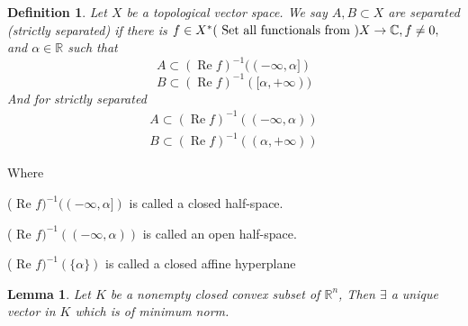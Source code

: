 \documentclass[oneside]{book}
\newtheorem{lemma}[theorem]{Lemma}
\newtheorem{mydef}{Definition}[section]
\begin{document}
	
	
	
	
	
	
	
	
	\begin{mydef} 
		Let $X$ be a topological vector space. We say $A, B \subset X$ are separated (strictly separated) if there is $f \in X^{*}(\text{ Set  all functionals from }) \newline
		X \rightarrow \mathbb{C}, f \neq 0,$ and $\alpha \in \mathbb{R}$ such that
		\[
		A \subset(\operatorname{Re} f)^{-1}((-\infty, \alpha])
		\]
		\[
		B \subset(\operatorname{Re} f)^{-1}([\alpha,+\infty))
		\]
		And for strictly separated
		\[
		\begin{array}{l}
		A \subset(\operatorname{Re} f)^{-1}((-\infty, \alpha)) \\
		B \subset(\operatorname{Re} f)^{-1}((\alpha,+\infty))
		\end{array}
		\]
	\end{mydef}
	
	Where 
	\hfill \ \break
	
	\quad \quad \quad \quad \quad 
	( Re $f)^{-1}((-\infty, \alpha])$ is called a closed half-space.
	\newline
	
	\quad \quad \quad \quad \quad ( Re $f)^{-1}((-\infty, \alpha))$ is called an open half-space.
	\newline
	
	\quad \quad \quad \quad \quad ( Re $f)^{-1}(\{\alpha\})$ is called a closed affine hyperplane
	
	
	
	
	
	
	
	\begin{lemma}
		\label{l:1}
		Let $K$ be a nonempty closed convex subset of $\mathbb{R}^{n}$, Then $\exists $ a  unique vector in $K$ which is of minimum norm.
	\end{lemma}
	
\end{document}
